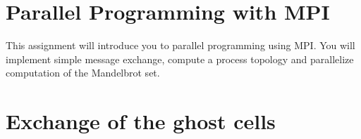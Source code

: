 \documentclass[unicode,11pt,a4paper,oneside,numbers=endperiod,openany]{scrartcl}
\begin{document}
\graphicspath{{./img/}}

\setassignment
{}

\newline

\section*{Parallel Programming with MPI }
This assignment will introduce you to parallel programming using MPI. You will implement simple message exchange, compute a process topology and parallelize computation of the Mandelbrot set.


\section{Exchange of the ghost cells }
\end{document}
